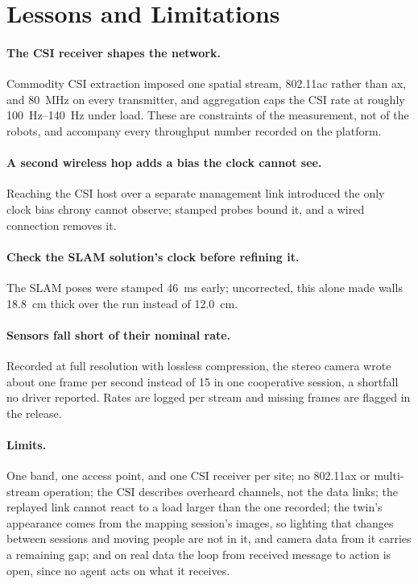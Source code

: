\section{Lessons and Limitations}
\label{sec:lessons}

\paragraph{The CSI receiver shapes the network.} Commodity CSI extraction
imposed one spatial stream, 802.11ac rather than ax, and
\SI{80}{\mega\hertz} on every transmitter, and aggregation caps the CSI
rate at roughly \SIrange{100}{140}{\hertz} under load. These are
constraints of the measurement, not of the robots, and accompany every
throughput number recorded on the platform.

\paragraph{A second wireless hop adds a bias the clock cannot see.}
Reaching the CSI host over a separate management link introduced the
only clock bias chrony cannot observe; stamped probes bound it, and a
wired connection removes it. 

\paragraph{Check the SLAM solution's clock before refining it.} The SLAM
poses were stamped \SI{46}{\milli\second} early; uncorrected, this alone
made walls \SI{18.8}{\centi\metre} thick over the run instead of
\SI{12.0}{\centi\metre}.

\paragraph{Sensors fall short of their nominal rate.} Recorded at full
resolution with lossless compression, the stereo camera wrote about one
frame per second instead of 15 in one cooperative session, a shortfall
no driver reported. Rates are logged per stream and missing frames are
flagged in the release.

\paragraph{Limits.} One band, one access point, and one CSI receiver per
site; no 802.11ax or multi-stream operation; the CSI describes overheard
channels, not the data links; the replayed link cannot react to a load larger than the one
recorded; the twin's appearance comes from the mapping session's
images, so lighting that changes between sessions and moving people are
not in it, and camera data from it carries a remaining gap;
and on real data the loop from received message to action is
open, since no agent acts on what it receives.
